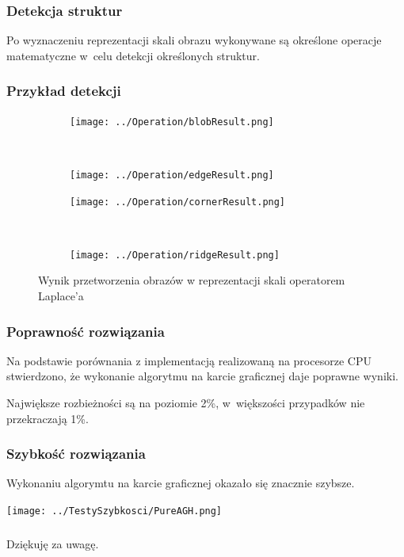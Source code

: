 \begin{frame}
\frametitle{Detekcja struktur}

Po wyznaczeniu reprezentacji skali obrazu wykonywane są określone operacje matematyczne w~celu detekcji określonych struktur.


\end{frame}
\begin{frame}
\frametitle{Przykład detekcji}

\begin{figure}[h]
\begin{center}
\begin{subfigure}[b]{2cm}
\centering
\texttt{[image: ../Operation/blobResult.png]}
\end{subfigure}~
\begin{subfigure}[b]{2cm}
\centering
\texttt{[image: ../Operation/edgeResult.png]}
\end{subfigure}

\begin{subfigure}[b]{2cm}
\centering
\texttt{[image: ../Operation/cornerResult.png]}
\end{subfigure}~
\begin{subfigure}[b]{2cm}
\centering
\texttt{[image: ../Operation/ridgeResult.png]}
\end{subfigure}
\caption{Wynik przetworzenia obrazów w reprezentacji skali operatorem Laplace'a}
\label{fig:wynik}
\end{center}
\end{figure}

\end{frame}
\begin{frame}
\frametitle{Poprawność rozwiązania}

Na podstawie porównania z implementacją realizowaną na procesorze CPU stwierdzono, że wykonanie algorytmu na karcie graficznej daje poprawne wyniki.

Największe rozbieżności są na poziomie 2\%, w~większości przypadków nie przekraczają 1\%.


\end{frame}
\begin{frame}
\frametitle{Szybkość rozwiązania}

Wykonaniu algorymtu na karcie graficznej okazało się znacznie szybsze.
\begin{center}
\texttt{[image: ../TestySzybkosci/PureAGH.png]}

\end{center}



\end{frame}

\begin{frame}
\frametitle{}
\begin{center}
Dziękuję za uwagę.
\end{center}
\end{frame}